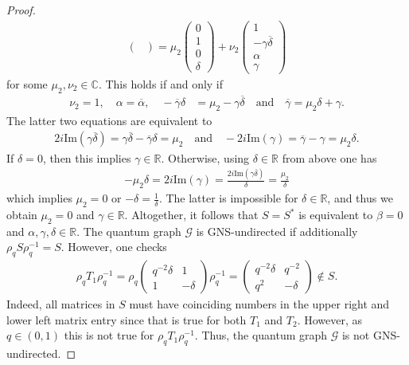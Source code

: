 \documentclass{amsart}
\newcommand{\R}{\mathbb{R}}
\newcommand{\C}{\mathbb{C}}
\begin{document}
\begin{proof}
\begin{align*}
\begin{pmatrix}
        \end{pmatrix}
        = \mu_2 \begin{pmatrix}
            0 \\ 1 \\ 0 \\ \delta
        \end{pmatrix}
        + \nu_2 \begin{pmatrix}
            1 \\ - \gamma \overline{\delta} \\ \alpha \\ \gamma
        \end{pmatrix}
    \end{align*}
    for some $\mu_2, \nu_2 \in \C$. This holds if and only if
    \begin{align*}
        \nu_2 = 1,\quad \alpha = \overline{\alpha},\quad
        -\overline{\gamma}\delta &= \mu_2 - \gamma \overline{\delta} 
        \quad\text{and}\quad
        \overline{\gamma} = \mu_2 \delta + \gamma.
    \end{align*}
    The latter two equations are equivalent to
    \begin{align*}
        2i\mathrm{Im}(\gamma \overline{\delta}) = \gamma \overline{\delta}  - \overline{\gamma}\delta = \mu_2 
        \quad\text{and}\quad
        - 2i\mathrm{Im}(\gamma) = \overline{\gamma} - \gamma = \mu_2 \delta.
    \end{align*}
    If $\delta = 0$, then this implies $\gamma \in \R$. Otherwise, using $\delta \in \R$ from above one has 
    \begin{align*}
        - \mu_2 \delta = 2i\mathrm{Im}(\gamma) = \frac{2i \mathrm{Im}(\gamma \overline{\delta})}{\delta} = \frac{\mu_2}{\delta}
    \end{align*}
    which implies $\mu_2 =0$ or $-\delta = \frac{1}{\delta}$. The latter is impossible for $\delta \in \R$, and thus we obtain $\mu_2 = 0$ and $\gamma\in\R$. Altogether, it follows that $S = S^\ast$ is equivalent to $\beta = 0$ and $\alpha, \gamma, \delta \in \R$.
    The quantum graph $\mathcal{G}$ is GNS-undirected if additionally $\rho_q S \rho_q^{-1} = S$. However, one checks
    \begin{align*}
        \rho_q T_1 \rho_q^{-1}
        = \rho_q \begin{pmatrix}
            q^{-2} \delta & 1 \\
            1 & - \delta
        \end{pmatrix}
        \rho_q^{-1}
        = \begin{pmatrix}
            q^{-2} \delta & q^{-2} \\
            q^2 & - \delta
        \end{pmatrix}
        \not \in S.
    \end{align*}
    Indeed, all matrices in $S$ must have coinciding numbers in the upper right and lower left matrix entry since that is true for both $T_1$ and $T_2$. However, as $q \in (0,1)$ this is not true for $\rho_q T_1 \rho_q^{-1}$. Thus, the quantum graph $\mathcal{G}$ is not GNS-undirected.


\end{proof}
\end{document}
